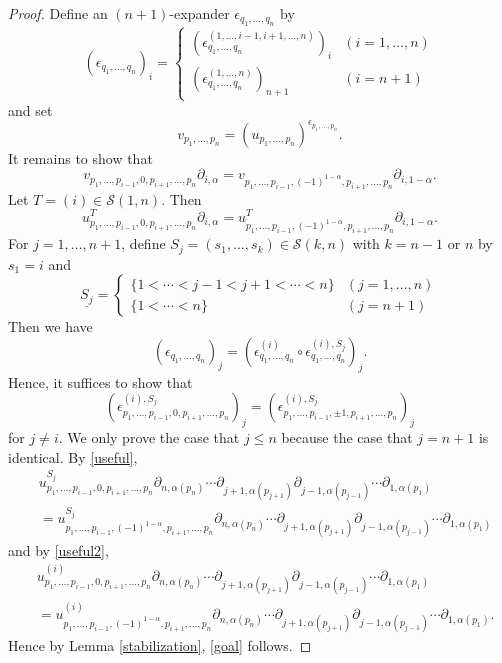 \documentclass[10pt,a4paper]{amsart}
\begin{document}
\begin{proof}
		
		
		Define an $(n+1)$-expander $\epsilon_{q_1,\ldots,q_n}$ by
		\[
		(\epsilon_{q_1,\ldots,q_n})_i=
		\begin{cases}
			(\epsilon_{q_1,\ldots,q_n}^{(1,\ldots,i-1,i+1,\ldots,n)})_i&(i=1,\ldots,n)\\
			(\epsilon_{q_1,\ldots,q_n}^{(1,\ldots,n)})_{n+1}&(i=n+1)
		\end{cases}
		\]
		and set
		\[
		v_{p_1,\ldots,p_n}=(u_{p_1,\ldots,p_n})^{\epsilon_{p_1,\ldots,p_n}}.
		\]
		It remains to show that
		\begin{equation}
			\label{goal}
			v_{p_1,\ldots,p_{i-1},0,p_{i+1},\ldots,p_n}\partial_{i,\alpha}=v_{p_1,\ldots,p_{i-1},(-1)^{1-\alpha},p_{i+1},\ldots,p_n}\partial_{i,1-\alpha}.
		\end{equation}
		Let $T=(i)\in\mathcal{S}(1,n)$. Then
		\begin{equation}
			\label{useful2}
			u_{p_1,\ldots,p_{i-1},0,p_{i+1},\ldots,p_n}^T\partial_{i,\alpha}=u_{p_1,\ldots,p_{i-1},(-1)^{1-\alpha},p_{i+1},\ldots,p_n}^T\partial_{i,1-\alpha}.
		\end{equation}
		For $j=1,\ldots,n+1$, define $S_j=(s_1,\ldots,s_k)\in\mathcal{S}(k,n)$ with $k=n-1$ or $n$ by $s_1=i$ and
		\[
		\underline{S_j}=
		\begin{cases}
			\{1<\cdots<j-1<j+1<\cdots<n\}&(j=1,\ldots,n)\\
			\{1<\cdots<n\}&(j=n+1)
		\end{cases}
		\]
		Then we have
		\[
		(\epsilon_{q_1,\ldots,q_n})_j=(\epsilon_{q_1,\ldots,q_n}^{(i)}\circ\epsilon_{q_1,\ldots,q_n}^{(i),S_j})_j.
		\]
		Hence, it suffices to show that
		\begin{equation}
			\label{goal2}
			(\epsilon_{p_1,\ldots,p_{i-1},0,p_{i+1},\ldots,p_n}^{(i),S_j})_j=(\epsilon_{p_1,\ldots,p_{i-1},\pm1,p_{i+1},\ldots,p_n}^{(i),S_j})_j
		\end{equation}
		for $j\ne i$. We only prove the case that $j\le n$ because the case that $j=n+1$ is identical. By \eqref{useful},
		\begin{align*}
			&u_{p_1,\ldots,p_{i-1},0,p_{i+1},\ldots,p_n}^{S_j}\partial_{n,\alpha(p_n)}\cdots\partial_{j+1,\alpha(p_{j+1})}\partial_{j-1,\alpha(p_{j-1})}\cdots\partial_{1,\alpha(p_1)}\\
			&=u_{p_1,\ldots,p_{i-1},(-1)^{1-\alpha},p_{i+1},\ldots,p_n}^{S_j}\partial_{n,\alpha(p_n)}\cdots\partial_{j+1,\alpha(p_{j+1})}\partial_{j-1,\alpha(p_{j-1})}\cdots\partial_{1,\alpha(p_1)}
		\end{align*}
		and by \eqref{useful2},
		\begin{align*}
			&u_{p_1,\ldots,p_{i-1},0,p_{i+1},\ldots,p_n}^{(i)}\partial_{n,\alpha(p_n)}\cdots\partial_{j+1,\alpha(p_{j+1})}\partial_{j-1,\alpha(p_{j-1})}\cdots\partial_{1,\alpha(p_1)}\\
			&=u_{p_1,\ldots,p_{i-1},(-1)^{1-\alpha},p_{i+1},\ldots,p_n}^{(i)}\partial_{n,\alpha(p_n)}\cdots\partial_{j+1,\alpha(p_{j+1})}\partial_{j-1,\alpha(p_{j-1})}\cdots\partial_{1,\alpha(p_1)}.
		\end{align*}
		Hence by Lemma \ref{stabilization}, \eqref{goal} follows.
	\end{proof}
\end{document}
